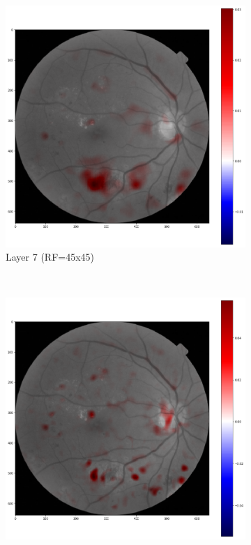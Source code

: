 \begin{figure}[!ht]
\begin{subfigure}{0.4\textwidth}
		\includegraphics[width=\textwidth]{Figures/chapter_interpretation/figures/maps/rf45c.png}
		\caption{Layer 7 (RF=45x45)}
		\label{score:fig:score_rf45}
	\end{subfigure}\\
	\begin{subfigure}{0.4\textwidth}
		\includegraphics[width=\textwidth]{Figures/chapter_interpretation/figures/maps/rf29c.png}

\end{subfigure}
\end{figure}
